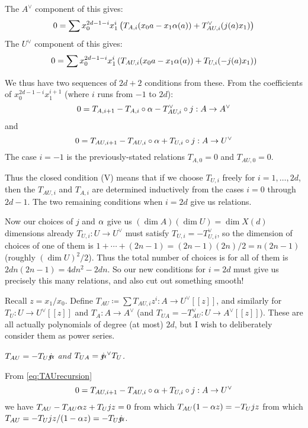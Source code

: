 {The $A^\vee$ component of this gives:
$$
0 = \sum x_0^{2d-1-i} x_1^i \left( T_{A,i} (x_0a -x_1 \alpha(a)) +  T_{AU,i}^\vee  (j(a) x_1) \right)
$$
The $U^\vee$ component of this gives:
$$0 = \sum x_0^{2d-1-i} x_1^i \left( T_{AU,i} (x_0a -x_1 \alpha(a)) +  T_{U,i}  (-j(a) x_1) \right)
$$

We thus have two sequences of $2d+2$ conditions from these.   From the coefficients of $x_0^{2d-1-i} x_1^{i+1}$ (where $i$ runs from $-1$ to $2d$):
\begin{equation}\label{eq:TArecursion}
  0 = T_{A, i+1} - T_{A,i} \circ \alpha - T_{AU,i}^\vee \circ j : A \rightarrow A^\vee
  \end{equation}
and
\begin{equation}\label{eq:TAUrecursion}
  0 = T_{AU, i+1}   - T_{AU,i} \circ \alpha + T_{U,i} \circ j: A \rightarrow U^\vee
  \end{equation}
The  case $i=-1$ is the previously-stated relations $T_{A,0}=0$ and $T_{AU,0}=0$.

Thus the closed condition (V) means that if we choose $T_{U,i}$ freely for $i=1, \dots, 2d$,
then the $T_{AU,i}$ and $T_{A,i}$ are determined inductively from the cases $i=0$ through $2d-1$.
The two remaining conditions when $i=2d$ give us relations.

Now our choices of $j$ and $\alpha$ give us $(\dim A)(\dim U) = \dim X(d)$ dimensions already
$T_{U,i}:U \rightarrow U^\vee$ must satisfy $T_{U,i} = - T_{U, i}^\vee$, so the dimension
of choices of one of them is $1 + \cdots+ (2n-1) = (2n-1)(2n)/2= n(2n-1)$ (roughly $(\dim U)^2/2$).
Thus the total number of choices is for all of them is $2dn(2n-1)=4dn^2-2dn$.
So our new conditions for $i=2d$ must give us precisely this many relations, and also cut out something smooth!



Recall $z=x_1/x_0$.  Define $\boxed{T_{AU}} \coloneq \sum T_{AU,i} z^i :  A \rightarrow U^\vee[[z]]$, and similarly for $\boxed{T_U} : U \rightarrow U^\vee[[z]]$ and $\boxed{T_A}: A \rightarrow A^\vee$ (and $\boxed{T_{UA}} = -T_{AU}^\vee: U \rightarrow A^\vee[[z]]$).  These are all actually polynomials of degree (at most) $2d$, but I wish to deliberately consider them as power series.

  {\em $T_{AU} = - T_U \mathord{j\mkern-7mu\alpha}$ and $T_{UA} = \mathord{j\mkern-7mu\alpha}^\vee T_U$.}

\bpf From \eqref{eq:TAUrecursion}
$$
0 = T_{AU, i+1}   - T_{AU,i} \circ \alpha + T_{U,i} \circ j: A \rightarrow U^\vee$$
we have
$T_{AU} - T_{AU} \alpha z + T_U jz = 0$ from which $T_{AU} (1-\alpha z) = - T_U jz$ from which
$T_{AU} = -T_U jz / (1-\alpha z) = - T_U \mathord{j\mkern-7mu\alpha}$. \epf

}

